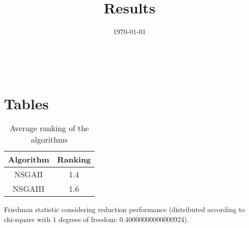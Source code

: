\documentclass{article}
\title{Results}
\author{}
\date{\today}
\begin{document}
\oddsidemargin 0in \topmargin 0in\maketitle
\
\section{Tables}
\begin{table}[!htp]
\centering
\caption{Average ranking of the algorithms}
\begin{tabular}{c|c}
Algorithm&Ranking\\
\hline
NSGAII&1.4\\
NSGAIII&1.6\\
\end{tabular}
\end{table}


Friedman statistic considering reduction performance (distributed according to chi-square with 1 degrees of freedom: 0.40000000000000924).
\end{document}
